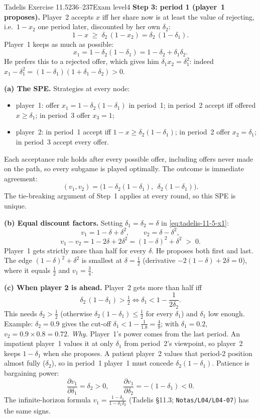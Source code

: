 \begin{exsol}{Tadelis Exercise 11.5}{236--237}{Exam level}{4}
\textbf{Step 3: period 1 (player~1 proposes).} Player~2 accepts $x$ iff her share now is at least
the value of rejecting, i.e.\ $1 - x_2$ one period later, discounted by her own $\delta_2$:
\[
  1 - x \;\ge\; \delta_2\,(1 - x_2) = \delta_2\,(1 - \delta_1) .
\]
Player~1 keeps as much as possible:
\begin{equation}
  x_1 = 1 - \delta_2(1 - \delta_1) = 1 - \delta_2 + \delta_1\delta_2 . \label{eq:tadelis-11-5-x1}
\end{equation}
He prefers this to a rejected offer, which gives him $\delta_1 x_2 = \delta_1^2$: indeed
$x_1 - \delta_1^2 = (1 - \delta_1)(1 + \delta_1 - \delta_2) > 0$.

\textbf{(a) The SPE.} Strategies at every node:
\begin{itemize}
  \item player~1: offer $x_1 = 1 - \delta_2(1-\delta_1)$ in period~1; in period~2 accept iff
  offered $x \ge \delta_1$; in period~3 offer $x_3 = 1$;
  \item player~2: in period~1 accept iff $1 - x \ge \delta_2(1-\delta_1)$; in period~2 offer
  $x_2 = \delta_1$; in period~3 accept every offer.
\end{itemize}
Each acceptance rule holds after every possible offer, including offers never made on the path, so
every subgame is played optimally. The outcome is immediate agreement:
\[
  (v_1, v_2) = \bigl(1 - \delta_2(1 - \delta_1),\ \ \delta_2(1 - \delta_1)\bigr).
\]
The tie-breaking argument of Step~1 applies at every round, so this SPE is unique.

\textbf{(b) Equal discount factors.} Setting $\delta_1 = \delta_2 = \delta$ in
\eqref{eq:tadelis-11-5-x1}:
\[
  v_1 = 1 - \delta + \delta^2, \qquad v_2 = \delta - \delta^2,
\]
\[
  v_1 - v_2 = 1 - 2\delta + 2\delta^2 = (1 - \delta)^2 + \delta^2 \;>\; 0 .
\]
Player~1 gets strictly more than half for every $\delta$. He proposes both first and last. The
edge $(1-\delta)^2 + \delta^2$ is smallest at $\delta = \frac12$ (derivative $-2(1-\delta) + 2\delta =
0$), where it equals $\frac12$ and $v_1 = \frac34$.

\textbf{(c) When player 2 is ahead.} Player~2 gets more than half iff
\[
  \delta_2\,(1 - \delta_1) > \tfrac12 \iff \delta_1 < 1 - \frac{1}{2\delta_2} .
\]
This needs $\delta_2 > \frac12$ (otherwise $\delta_2(1-\delta_1) \le \frac12$ for every $\delta_1$) and
$\delta_1$ low enough. Example: $\delta_2 = 0.9$ gives the cut-off $\delta_1 < 1 - \frac{1}{1.8} =
\frac49$; with $\delta_1 = 0.2$, $v_2 = 0.9 \times 0.8 = 0.72$.
\emph{Why.} Player~1's power comes from the last period. An impatient player~1 values it at only
$\delta_1$ from period~2's viewpoint, so player~2 keeps $1 - \delta_1$ when she proposes. A patient
player~2 values that period-2 position almost fully ($\delta_2$), so in period~1 player~1 must
concede $\delta_2(1 - \delta_1)$. Patience is bargaining power:
\[
  \frac{\partial v_1}{\partial \delta_1} = \delta_2 > 0, \qquad
  \frac{\partial v_1}{\partial \delta_2} = -(1 - \delta_1) < 0 .
\]
The infinite-horizon formula $v_1 = \frac{1 - \delta_2}{1 - \delta_1\delta_2}$ (Tadelis \S11.3;
\texttt{Notas/L04/L04-07}) has the same signs.


\end{exsol}
